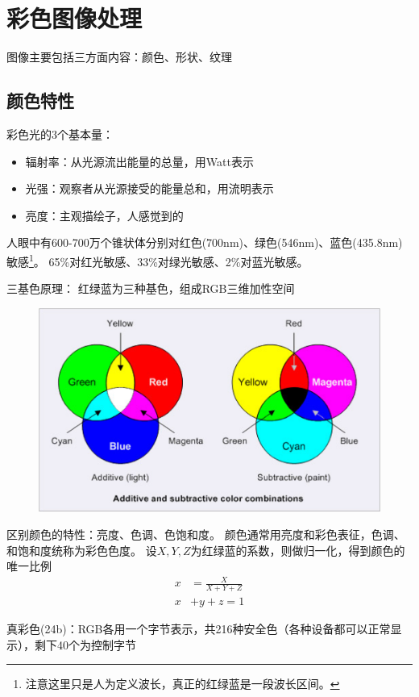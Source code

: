 
\section{彩色图像处理}
图像主要包括三方面内容：颜色、形状、纹理

\subsection{颜色特性}
彩色光的3个基本量：
\begin{itemize}
	\item 辐射率：从光源流出能量的总量，用Watt表示
	\item 光强：观察者从光源接受的能量总和，用流明表示
	\item 亮度：主观描绘子，人感觉到的
\end{itemize}

人眼中有600-700万个锥状体分别对红色(700nm)、绿色(546nm)、蓝色(435.8nm)敏感\footnote{注意这里只是人为定义波长，真正的红绿蓝是一段波长区间。}。
65\%对红光敏感、33\%对绿光敏感、2\%对蓝光敏感。

三基色原理：
红绿蓝为三种基色，组成RGB三维加性空间
\begin{figure}[H]
\centering
\includegraphics[width=0.8\linewidth]{fig/rgb_and_cmyk.png}
\end{figure}

区别颜色的特性：亮度、色调、色饱和度。
颜色通常用亮度和彩色表征，色调、和饱和度统称为彩色色度。
设$X,Y,Z$为红绿蓝的系数，则做归一化，得到颜色的唯一比例
\[\begin{aligned}
x&=\frac{X}{X+Y+Z}\\
x&+y+z=1
\end{aligned}\]

真彩色(24b)：RGB各用一个字节表示，共216种安全色（各种设备都可以正常显示），剩下40个为控制字节

